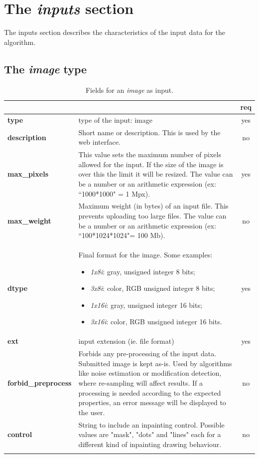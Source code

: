 \section{The \emph{inputs} section}
The inputs section describes the characteristics of the input data for the algorithm.

\subsection{The \emph{image} type}

\begin{longtable}{|>{\bf}L{\linewidth}|L{\linewidth}|c|}
\hline
{}     &  & {\bf req} \tabularnewline 
\hline \hline
 type         & type of the input: image & yes \\ \hline
 description  & Short name or description. This is used by the web interface. & no \\ \hline
 max\_pixels  & This value sets the maximum number of pixels allowed for the input. If the size of the image is over this the limit it will be resized. The value can be a number or an arithmetic expression (ex:  ``1000*1000" = 1 Mpx).  & yes \\ \hline
 max\_weight   & Maximum weight (in bytes) of an input file. This prevents uploading too large files. The value can be a number or an arithmetic expression (ex: ``100*1024*1024"= 100 Mb). & no \\ \hline
 dtype        & Final format for the image. Some examples:
\begin{itemize}
  \setlength\itemsep{-0.5em}
  \item \textit{1x8i}: gray, unsigned integer 8 bits;
  \item \textit{3x8i}: color, RGB unsigned integer 8 bits;
  \item \textit{1x16i}: gray, unsigned integer 16 bits;
  \item \textit{3x16i}: color, RGB unsigned integer 16 bits.
\end{itemize} 
 & yes \\ \hline
 ext          & input extension (ie. file format) & yes \\ \hline
forbid\_preprocess & Forbids any pre-processing of the input data. 
Submitted image is kept as-is. Used by algorithms like noise estimation or modification detection, where re-sampling will affect results. 
If a processing is needed according to the expected properties, an error message will be displayed to the user.
& no \\ \hline
 control & String to include an inpainting control. Possible values are "mask", "dots" and "lines" each for a different kind of inpainting drawing behaviour. & no \\ \hline
\caption{Fields for an \emph{image} as input.}
\end{longtable}

